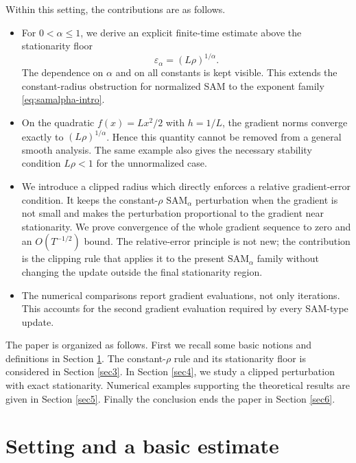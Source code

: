 \documentclass[11pt]{article}
\theoremstyle{remark}
\newcommand{\SAMa}{\mathrm{SAM}_{\alpha}}
\begin{document}
Within this  setting, the contributions are as follows.
\begin{itemize}
  \item For $0<\alpha\leq1$, we derive an explicit finite-time estimate
  above the stationarity floor
  $$
      \varepsilon_\alpha=(L\rho)^{1/\alpha}.
  $$
  The dependence on $\alpha$ and on all constants is kept visible.  This
  extends the constant-radius obstruction for normalized SAM to the
  exponent family \eqref{eq:samalpha-intro}.

  \item On the quadratic $f(x)=Lx^2/2$ with $h=1/L$, the gradient norms
  converge exactly to $(L\rho)^{1/\alpha}$.  Hence this quantity cannot be
  removed from a general smooth analysis.  The same example also gives the
  necessary stability condition $L\rho<1$ for the unnormalized case.

  \item We introduce a clipped radius which directly enforces a relative
  gradient-error condition.  It keeps the constant-$\rho$ $\SAMa$
  perturbation when the gradient is not small and makes the perturbation
  proportional to the gradient near stationarity.  We prove convergence of
  the whole gradient sequence to zero and an $O(T^{-1/2})$ bound.  The
  relative-error principle is not new; the contribution is the clipping
  rule that applies it to the present $\SAMa$ family without changing the
  update outside the final stationarity region.

  \item The numerical comparisons report gradient evaluations, not only
  iterations.  This accounts for the second gradient evaluation required by
  every SAM-type update.
\end{itemize}

The paper is organized as follows. First we recall some basic notions and definitions in Section \ref{sec2}. The \texorpdfstring{constant-$\rho$}{constant-rho} rule and its
stationarity floor is considered in Section \ref{sec3}. In Section \ref{sec4}, we study a clipped perturbation with exact stationarity. Numerical examples supporting the theoretical results are given in  Section \ref{sec5}. Finally the conclusion ends the paper in Section \ref{sec6}.

\section{Setting and a basic estimate}\label{sec2}
\end{document}
